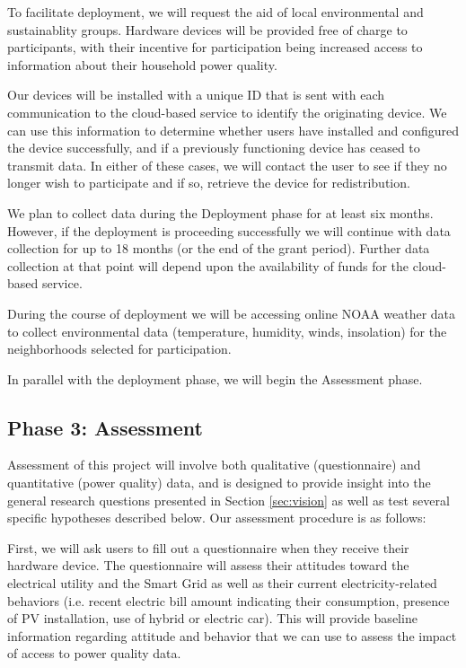 To facilitate deployment, we will request the aid of local environmental and sustainablity groups.  Hardware devices will be provided free of charge to participants, with their incentive for participation being increased access to information about their household power quality.  

Our devices will be installed with a unique ID that is sent with each communication to the cloud-based service to identify the originating device.  We can use this information to determine whether users have installed and configured the device successfully, and if a previously functioning device has ceased to transmit data.   In either of these cases, we will contact the user to see if they no longer wish to participate and if so, retrieve the device for redistribution. 

We plan to collect data during the Deployment phase for at least six months. However, if the deployment is proceeding successfully we will continue with data collection for up to 18 months (or the end of the grant period).  Further data collection at that point will depend upon the availability of funds for the cloud-based service.

During the course of deployment we will be accessing online NOAA weather data to collect environmental data (temperature, humidity, winds, insolation) for the neighborhoods selected for participation. 

In parallel with the deployment phase, we will begin the Assessment phase. 

\subsection{Phase 3: Assessment}

Assessment of this project will involve both qualitative (questionnaire) and quantitative (power quality) data, and is designed to provide insight into the general research questions presented in Section \ref{sec:vision} as well as test several specific hypotheses described below. Our assessment procedure is as follows:

First, we will ask users to fill out a questionnaire when they receive their hardware device.  The questionnaire will assess their attitudes toward the electrical utility and the Smart Grid as well as their current electricity-related behaviors (i.e. recent electric bill amount indicating their consumption, presence of PV installation, use of hybrid or electric car). This will provide baseline information regarding attitude and behavior that we can use to assess the impact of access to power quality data.

